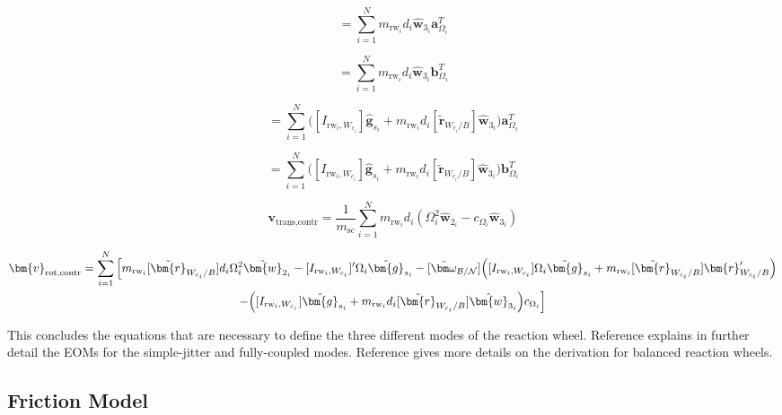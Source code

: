 \begin{equation}
[A_\text{contr}] = \sum\limits_{i=1}^{N}m_{\text{rw}_i}d_i\hat{\bm{w}}_{3_i}\bm{a}_{\Omega_i}^T
\end{equation}

\begin{equation}
[B_\text{contr}] = \sum\limits_{i=1}^{N}m_{\text{rw}_i}d_i\hat{\bm{w}}_{3_i}\bm{b}_{\Omega_i}^T
\end{equation}

\begin{equation}
[C_\text{contr}] = \sum\limits_{i=1}^{N}\Big([I_{\text{rw}_i,W_{c_i}}]\hat{\bm{g}}_{s_i} + m_{\text{rw}_i}d_i[\tilde{\bm{r}}_{W_{c_i}/B}]\hat{\bm{w}}_{3_i}\Big)\bm{a}_{\Omega_i}^T
\end{equation}

\begin{equation}
[D_\text{contr}] = \sum\limits_{i=1}^{N}\Big([I_{\text{rw}_i,W_{c_i}}]\hat{\bm{g}}_{s_i} + m_{\text{rw}_i}d_i[\tilde{\bm{r}}_{W_{c_i}/B}]\hat{\bm{w}}_{3_i}\Big)\bm{b}_{\Omega_i}^T
\end{equation}

\begin{equation}
\bm{v}_\text{trans,contr} = \frac{1}{m_{\text{sc}}}\sum\limits_{i=1}^{N}m_{\text{rw}_i}d_i\left(\Omega_i^2\hat{\bm{w}}_{2_i}-c_{\Omega_i}\hat{\bm{w}}_{3_i}\right)
\end{equation}

\begin{multline}
\bm{v}_\text{rot,contr} = \sum\limits_{i=1}^{N} \Big[ m_{\text{rw}_i}[\tilde{\bm{r}}_{W_{c_i}/B}]d_i \Omega_i^2\hat{\bm{w}}_{2_i}-[I_{\text{rw}_i,W_{c_i}}]'\Omega_i \hat{\bm{g}}_{s_i} -[\tilde{\bm\omega}_{\cal B/N}]\Big([I_{\text{rw}_i,W_{c_i}}]\Omega_i \hat{\bm{g}}_{s_i}+ m_{\text{rw}_i}[\tilde{\bm{r}}_{W_{c_i}/B}]\bm{r}'_{W_{c_i}/B}\Big) \\
-\Big([I_{\text{rw}_i,W_{c_i}}]\hat{\bm{g}}_{s_i} + m_{\text{rw}_i}d_i[\tilde{\bm{r}}_{W_{c_i}/B}]\hat{\bm{w}}_{3_i}\Big)c_{\Omega_i} \Big]
\end{multline}

This concludes the equations that are necessary to define the three different modes of the reaction wheel. Reference\cite{Alcorn:2016yq} explains in further detail the EOMs for the simple-jitter and fully-coupled modes. Reference\cite{schaub} gives more details on the derivation for balanced reaction wheels.

\subsection{Friction Model}
\label{sec:Friction}

